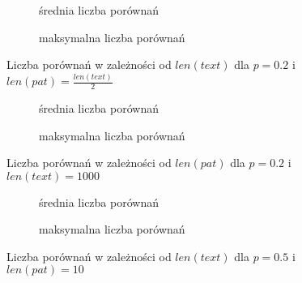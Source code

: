 \begin{figure}[htb]
    \centering
    \begin{subfigure}[b]{0.49\textwidth}
        \centering
        
        \caption{średnia liczba porównań}
        \label{fig:result_alph_geo_02_pat_len(text)2_plot_avg_100}
    \end{subfigure}
    \hfill
    \begin{subfigure}[b]{0.49\textwidth}
        \centering
        
        \caption{maksymalna liczba porównań}
        \label{fig:result_alph_geo_02_pat_len(text)2_plot_max_100}
    \end{subfigure}
    \hfill
    \caption{Liczba porównań w zależności od $len(text)$ dla $p = 0.2$ i $len(pat) = \frac{len(text)}{2}$}
    \label{fig:result_alph_geo_02_pat_len(text)2}
\end{figure}

\begin{figure}[htb]
    \centering
    \begin{subfigure}[b]{0.49\textwidth}
        \centering
        
        \caption{średnia liczba porównań}
        \label{fig:result_alph_geo_02_text_1000_plot_avg_100}
    \end{subfigure}
    \hfill
    \begin{subfigure}[b]{0.49\textwidth}
        \centering
        
        \caption{maksymalna liczba porównań}
        \label{fig:result_alph_geo_02_text_1000_plot_max_100}
    \end{subfigure}
    \hfill
    \caption{Liczba porównań w zależności od $len(pat)$ dla $p = 0.2$ i $len(text) = 1000$}
    \label{fig:result_alph_geo_02_text_1000}
\end{figure}

\begin{figure}[htb]
    \centering
    \begin{subfigure}[b]{0.49\textwidth}
        \centering
        
        \caption{średnia liczba porównań}
        \label{fig:result_alph_geo_05_pat_10_plot_avg_100}
    \end{subfigure}
    \hfill
    \begin{subfigure}[b]{0.49\textwidth}
        \centering
        
        \caption{maksymalna liczba porównań}
        \label{fig:result_alph_geo_05_pat_10_plot_max_100}
    \end{subfigure}
    \hfill
    \caption{Liczba porównań w zależności od $len(text)$ dla $p = 0.5$ i $len(pat) = 10$}
    \label{fig:result_alph_geo_05_pat_10}
\end{figure}

